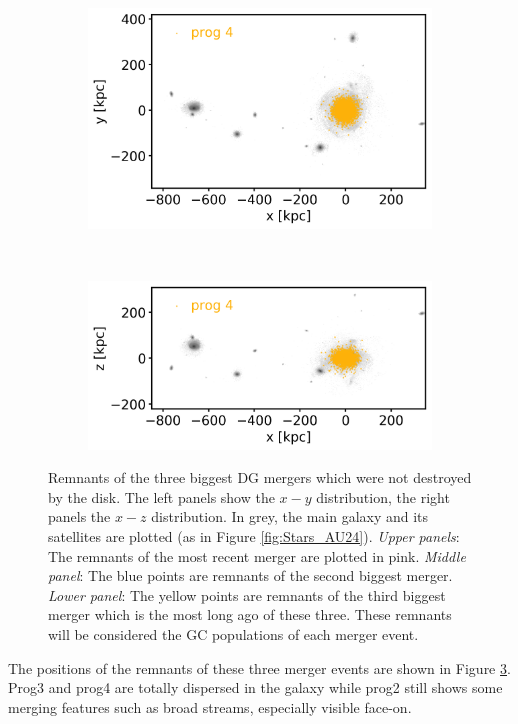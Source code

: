 \begin{figure}[htbp]
    \begin{subfigure}[c]{0.48\textwidth}
    \centering
    	\includegraphics[width=\textwidth]{plots/Dynamics/dist/xy_dist_wodisk_GCs_prog_4_snap_127.png}
    	\label{fig:prog4_xy}
    \end{subfigure}
    ~ %
    \begin{subfigure}[c]{0.48\textwidth}
        \centering
    	\includegraphics[width=\textwidth]{plots/Dynamics/dist/xz_dist_wodisk_GCs_prog_4_snap_127.png}
	    \label{fig:prog4_xz}
    \end{subfigure}
    \caption{Remnants of the three biggest \ac{DG} mergers which were not destroyed by the disk. The left panels show the $x-y$ distribution, the right panels the $x-z$ distribution. In grey, the main galaxy and its satellites are plotted (as in Figure \ref{fig:Stars_AU24}). \textit{Upper panels}: The remnants of the most recent merger are plotted in pink. \textit{Middle panel}: The blue points are remnants of the second biggest merger. \textit{Lower panel}: The yellow points are remnants of the third biggest merger which is the most long ago of these three. These remnants will be considered the \ac{GC} populations of each merger event.}\label{fig:progenitors_distribution}
\end{figure}
The positions of the remnants of these three merger events are shown in Figure \ref{fig:progenitors_distribution}. Prog3 and prog4 are totally dispersed in the galaxy while prog2 still shows some merging features such as broad streams, especially visible face-on. 

